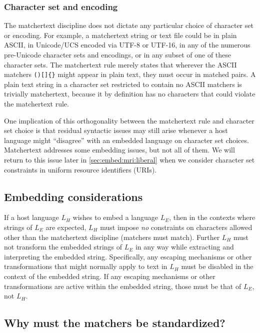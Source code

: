 \subsubsection{Character set and encoding}

The matchertext discipline does not dictate any particular choice
of character set or encoding.
For example, a matchertext string or text file could be in plain ASCII,
in Unicode/UCS encoded via UTF-8 or UTF-16,
in any of the numerous pre-Unicode character sets and encodings,
or in any subset of one of these character sets.
The matchertext rule merely states that
wherever the ASCII matchers
\verb|()[]{}|
might appear in plain text,
they must occur in matched pairs.
A plain text string in a character set restricted to contain no ASCII matchers
is trivially matchertext,
because it by definition has no characters
that could violate the matchertext rule.

One implication of this orthogonality between the matchertext rule
and character set choice
is that residual syntactic issues may still arise
whenever a host language might ``disagree'' with an embedded language
on character set choices.
Matchertext addresses some embedding issues, but not all of them.
We will return to this issue later in \cref{sec:embed:mri:liberal}
when we consider character set constraints
in uniform resource identifiers (URIs).


\subsection{Embedding considerations}

If a host language $L_H$ wishes to embed a language $L_E$,
then in the contexts where strings of $L_E$ are expected,
$L_H$ must impose \emph{no} constraints on characters allowed
other than the matchertext discipline (matchers must match).
Further $L_H$ must not transform the embedded strings of $L_E$ in any way
while extracting and interpreting the embedded string.
Specifically, any escaping mechanisms or other transformations
that might normally apply to text in $L_H$
must be disabled in the context of the embedded string.
If any escaping mechanisms or other transformations
are active within the embedded string,
those must be that of $L_E$, not $L_H$.




\subsection{Why must the matchers be standardized?}



